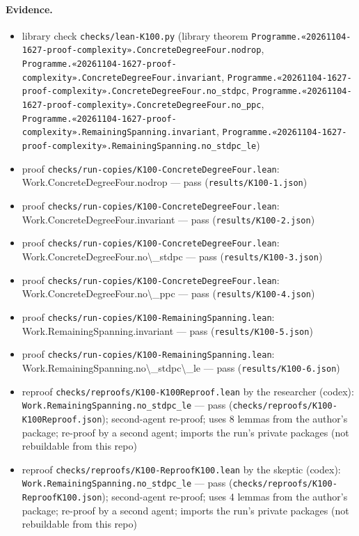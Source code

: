 \documentclass{article}
\begin{document}
\paragraph{Evidence.}
\begin{itemize}
\item library check \texttt{checks/lean-K100.py} (library theorem \texttt{Programme.«20261104-1627-proof-complexity».ConcreteDegreeFour.nodrop}, \texttt{Programme.«20261104-1627-proof-complexity».ConcreteDegreeFour.invariant}, \texttt{Programme.«20261104-1627-proof-complexity».ConcreteDegreeFour.no\_stdpc}, \texttt{Programme.«20261104-1627-proof-complexity».ConcreteDegreeFour.no\_ppc}, \texttt{Programme.«20261104-1627-proof-complexity».RemainingSpanning.invariant}, \texttt{Programme.«20261104-1627-proof-complexity».RemainingSpanning.no\_stdpc\_le})
\item proof \texttt{checks/run-copies/K100-ConcreteDegreeFour.lean}: Work.ConcreteDegreeFour.nodrop --- pass (\texttt{results/K100-1.json})
\item proof \texttt{checks/run-copies/K100-ConcreteDegreeFour.lean}: Work.ConcreteDegreeFour.invariant --- pass (\texttt{results/K100-2.json})
\item proof \texttt{checks/run-copies/K100-ConcreteDegreeFour.lean}: Work.ConcreteDegreeFour.no\textbackslash{}\_stdpc --- pass (\texttt{results/K100-3.json})
\item proof \texttt{checks/run-copies/K100-ConcreteDegreeFour.lean}: Work.ConcreteDegreeFour.no\textbackslash{}\_ppc --- pass (\texttt{results/K100-4.json})
\item proof \texttt{checks/run-copies/K100-RemainingSpanning.lean}: Work.RemainingSpanning.invariant --- pass (\texttt{results/K100-5.json})
\item proof \texttt{checks/run-copies/K100-RemainingSpanning.lean}: Work.RemainingSpanning.no\textbackslash{}\_stdpc\textbackslash{}\_le --- pass (\texttt{results/K100-6.json})
\item reproof \texttt{checks/reproofs/K100-K100Reproof.lean} by the researcher (codex): \texttt{Work.RemainingSpanning.no\_stdpc\_le} --- pass (\texttt{checks/reproofs/K100-K100Reproof.json}); second-agent re-proof; uses 8 lemmas from the author's package; re-proof by a second agent; imports the run's private packages (not rebuildable from this repo)
\item reproof \texttt{checks/reproofs/K100-ReproofK100.lean} by the skeptic (codex): \texttt{Work.RemainingSpanning.no\_stdpc\_le} --- pass (\texttt{checks/reproofs/K100-ReproofK100.json}); second-agent re-proof; uses 4 lemmas from the author's package; re-proof by a second agent; imports the run's private packages (not rebuildable from this repo)
\end{itemize}
\end{document}
